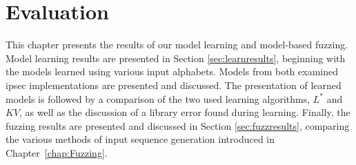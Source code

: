 %
%
% 
% 
% 

\chapter{Evaluation} \label{chap:Evaluation}

This chapter presents the results of our model learning and model-based fuzzing. Model learning results are presented in Section \ref{sec:learnresults}, beginning with the models learned using various input alphabets. Models from both examined \ac{ipsec} implementations are presented and discussed. The presentation of learned models is followed by a comparison of the two used learning algorithms, $L^*$ and $KV$, as well as the discussion of a library error found during learning. Finally, the fuzzing results are presented and discussed in Section \ref{sec:fuzzresults}, comparing the various methods of input sequence generation introduced in Chapter~\ref{chap:Fuzzing}.

\iffalse
